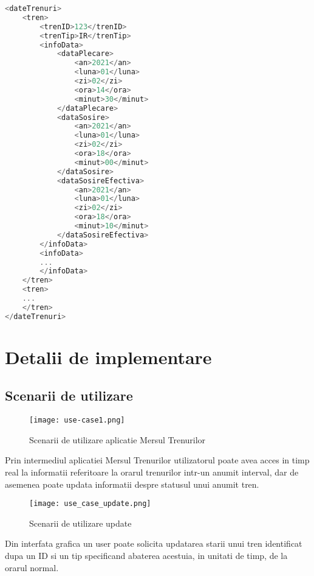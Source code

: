 \documentclass[runningheads]{llncs}
\begin{document}
\begin{lstlisting}[language=c++,caption={MersulTrenurilor.xml example}]
<dateTrenuri>
    <tren>
        <trenID>123</trenID>
        <trenTip>IR</trenTip>
        <infoData>
            <dataPlecare>
                <an>2021</an>
                <luna>01</luna>
                <zi>02</zi>
                <ora>14</ora>
                <minut>30</minut>
            </dataPlecare>
            <dataSosire>
                <an>2021</an>
                <luna>01</luna>
                <zi>02</zi>
                <ora>18</ora>
                <minut>00</minut>
            </dataSosire>
            <dataSosireEfectiva>
                <an>2021</an>
                <luna>01</luna>
                <zi>02</zi>
                <ora>18</ora>
                <minut>10</minut>
            </dataSosireEfectiva>
        </infoData>
        <infoData>
        ...
        </infoData>
    </tren>
    <tren>
    ...
    </tren>
</dateTrenuri>
\end{lstlisting}

\clearpage

\section{Detalii de implementare}
\subsection{Scenarii de utilizare}

\begin{figure}[htp]
    \centering
    \texttt{[image: use-case1.png]}
    \caption{Scenarii de utilizare aplicatie Mersul Trenurilor}
\end{figure}

\indent Prin intermediul aplicatiei Mersul Trenurilor utilizatorul poate avea acces in timp real la informatii referitoare la orarul trenurilor intr-un anumit interval, dar de asemenea poate updata informatii despre statusul unui anumit tren.

\begin{figure}[htp]
    \centering
    \texttt{[image: use\_case\_update.png]}
    \caption{Scenarii de utilizare update}
\end{figure}
Din interfata grafica un user poate solicita updatarea starii unui tren identificat dupa un ID si un tip specificand abaterea acestuia, in unitati de timp, de la orarul normal. 
\clearpage
\end{document}
